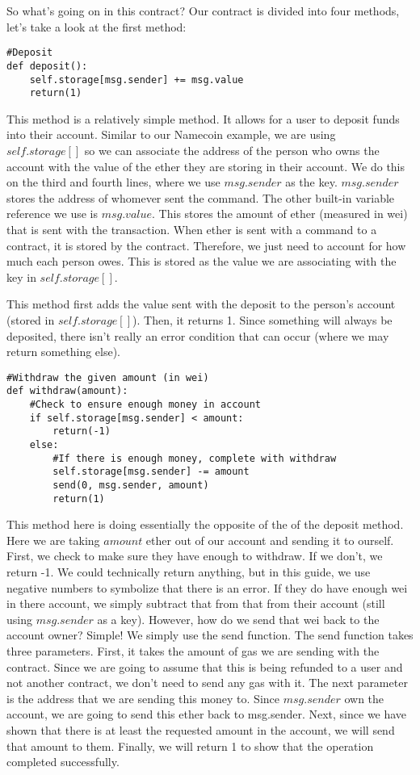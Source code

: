 \documentclass[12pt]{article}
\begin{document}
So what's going on in this contract?
Our contract is divided into four methods, let's take a look at the first method:

\begin{verbatim}
#Deposit
def deposit():
	self.storage[msg.sender] += msg.value
	return(1)
\end{verbatim}

This method is a relatively simple method. It allows for a user to deposit funds into their account. Similar to our Namecoin example, we are using $self.storage[]$ so we can associate the address of the person who owns the account with the value of the ether they are storing in their account. We do this on the third and fourth lines, where we use $msg.sender$ as the key. $msg.sender$ stores the address of whomever sent the command. The other built-in variable reference we use is $msg.value$. This stores the amount of ether (measured in wei) that is sent with the transaction. When ether is sent with a command to a contract, it is stored by the contract. Therefore, we just need to account for how much each person owes. This is stored as the value we are associating with the key in $self.storage[]$.
 
This method first adds the value sent with the deposit to the person's account (stored in $self.storage[]$). Then, it returns 1. Since something will always be deposited, there isn't really an error condition that can occur (where we may return something else). 

\begin{verbatim}
#Withdraw the given amount (in wei)
def withdraw(amount):
	#Check to ensure enough money in account
	if self.storage[msg.sender] < amount:
		return(-1)
	else:
		#If there is enough money, complete with withdraw
		self.storage[msg.sender] -= amount
		send(0, msg.sender, amount)
		return(1)
\end{verbatim}

This method here is doing essentially the opposite of the of the deposit method. Here we are taking $amount$ ether out of our account and sending it to ourself. First, we check to make sure they have enough to withdraw. If we don't, we return -1. We could technically return anything, but in this guide, we use negative numbers to symbolize that there is an error. If they do have enough wei in there account, we simply subtract that from that from their account (still using $msg.sender$ as a key). However, how do we send that wei back to the account owner? Simple! We simply use the send function. The send function takes three parameters. First, it takes the amount of gas we are sending with the contract. Since we are going to assume that this is being refunded to a user and not another contract, we don't need to send any gas with it. The next parameter is the address that we are sending this money to. Since $msg.sender$ own the account, we are going to send this ether back to msg.sender. Next, since we have shown that there is at least the requested amount in the account, we will send that amount to them. Finally, we will return 1 to show that the operation completed successfully.
\end{document}
